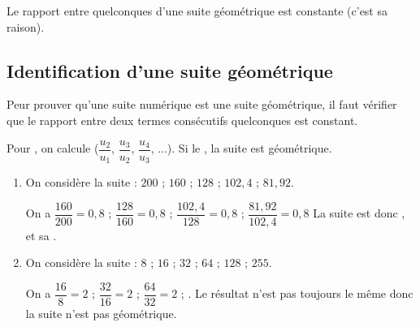 \documentclass[12pt,a4paper]{article}
\begin{document}
\begin{myprop}
	Le rapport entre  quelconques d'une suite géométrique est constante (c'est sa raison).
\end{myprop}

\subsection{Identification d'une suite géométrique}
\begin{mymeth}
	Peur prouver qu'une suite numérique est une suite géométrique, il faut vérifier que le rapport entre deux termes consécutifs quelconques est constant.
	
	Pour , on calcule  ($\dfrac{u_2}{u_1}$, $\dfrac{u_3}{u_2}$, $\dfrac{u_4}{u_3}$, ...). Si le , la suite est géométrique.
	
\end{mymeth}

\begin{myexs}
	\begin{enumerate}
		\item On considère la suite : $200$ ; $160$ ; $128$ ; $102,4$ ; $81,92$.
		
		On a $\dfrac{160}{200}=0,8$ ; $\dfrac{128}{160}=0,8$ ; $\dfrac{102,4}{128}=0,8$ ; $\dfrac{81,92}{102,4}=0,8$
		La suite est donc , et sa .
		
		\item On considère la suite : $8$ ; $16$ ; $32$ ; $64$ ; $128$ ; $255$.
		
		On a $\dfrac{16}{8}=2$ ; $\dfrac{32}{16}=2$ ; $\dfrac{64}{32}=2$ ; .
		Le résultat n'est pas toujours le même donc la suite n'est pas géométrique.
	\end{enumerate}
\end{myexs}
\end{document}
